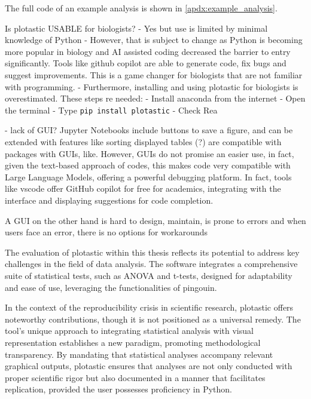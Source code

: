 
The full code of an example analysis is shown in \autoref{apdx:example_analysis}.





Is plotastic USABLE for biologists?
- Yes but use is limited by minimal knowledge of Python
- However, that is subject to change as Python is becoming more popular
in biology and AI assisted coding decreased the barrier to entry
significantly. Tools like github copilot are able to generate code, fix
bugs and suggest improvements. This is a game changer for biologists
that are not familiar with programming.
- Furthermore, installing and using plotastic for biologists is overestimated. These
steps re needed:
- Install anaconda from the internet
- Open the terminal
- Type \texttt{pip install plotastic}
- Check Rea

- lack of GUI? Jupyter Notebooks include buttons to save a figure, and can be
extended with features like sorting displayed tables (?) are compatible with
packages with GUIs, like. However, GUIs do not promise an easier use, in fact,
given the text-based approach of codes, this makes code very compatible with
Large Language Models, offering a powerful debugging platform. In fact, tools like vscode offer GitHub copilot for free for academics,
integrating with the interface and displaying suggestions for code completion.

A GUI on the other hand is
hard to design, maintain, is prone to errors and when users face an error, there
is no options for workarounds


The evaluation of plotastic within this thesis reflects its potential to address
key challenges in the field of data analysis. The software integrates a
comprehensive suite of statistical tests, such as ANOVA and t-tests, designed
for adaptability and ease of use, leveraging the functionalities of pingouin.

In the context of the reproducibility crisis in scientific research, plotastic
offers noteworthy contributions, though it is not positioned as a universal
remedy. The tool's unique approach to integrating statistical analysis with
visual representation establishes a new paradigm, promoting methodological
transparency. By mandating that statistical analyses accompany relevant
graphical outputs, plotastic ensures that analyses are not only conducted with
proper scientific rigor but also documented in a manner that facilitates
replication, provided the user possesses proficiency in Python.

